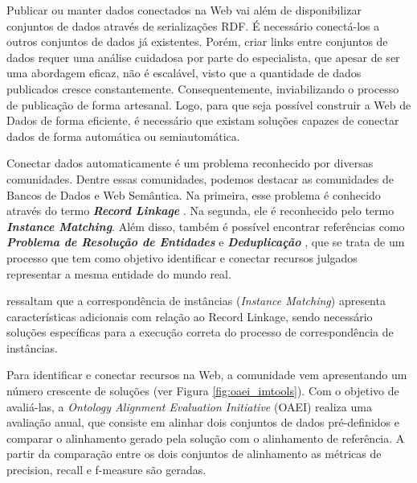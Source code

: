 Publicar ou manter dados conectados na Web vai além de disponibilizar conjuntos de dados através de serializações RDF. É necessário conectá-los a outros conjuntos de dados já existentes. Porém, criar links entre conjuntos de dados requer uma análise cuidadosa por parte do especialista, que apesar de ser uma abordagem eficaz, não é escalável, visto que a quantidade de dados publicados cresce constantemente. Consequentemente, inviabilizando o processo de publicação de forma artesanal. Logo, para que seja possível construir a Web de Dados de forma eficiente, é necessário que existam soluções capazes de conectar dados de forma automática ou semiautomática.

Conectar dados automaticamente é um problema reconhecido por diversas comunidades. Dentre essas comunidades, podemos destacar as comunidades de Bancos de Dados e Web Semântica. Na primeira, esse problema é conhecido através do termo \textbf{\textit{Record Linkage}} \cite{gu2003record}. Na segunda, ele é reconhecido pelo termo \textbf{\textit{Instance Matching}}. Além disso, também é possível encontrar referências como \textbf{\textit{Problema de Resolução de Entidades}} \cite{menestrina2005generic} e \textbf{\textit{Deduplicação}} \cite{sarawagi2002interactive}, que se trata de um processo que tem como objetivo identificar e conectar recursos julgados representar a mesma entidade do mundo real.

 ressaltam que a correspondência de instâncias (\textit{Instance Matching}) apresenta características adicionais com relação ao Record Linkage, sendo necessário soluções específicas para a execução correta do processo de correspondência de instâncias.

Para identificar e conectar recursos na Web, a comunidade vem apresentando um número crescente de soluções (ver Figura \ref{fig:oaei_imtools}). Com o objetivo de avaliá-las, a \textit{Ontology Alignment Evaluation Initiative} (OAEI) realiza uma avaliação anual, que consiste em alinhar dois conjuntos de dados pré-definidos e comparar o alinhamento gerado pela solução com o alinhamento de referência. A partir da comparação entre os dois conjuntos de alinhamento as métricas de precision, recall e f-measure são geradas.

